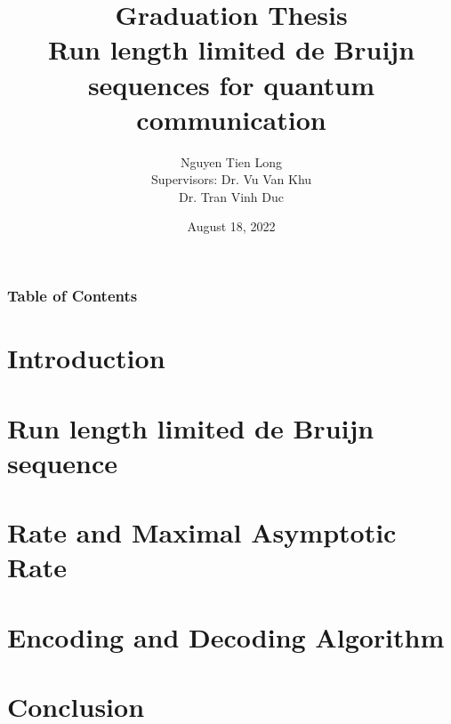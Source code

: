 \documentclass{beamer}
\title[]{{\huge \bf Graduation Thesis} \\
\large Run length limited de Bruijn sequences for quantum communication}
\author[Nguyen Tien Long]{
Nguyen Tien Long
\texorpdfstring{ \\ {\small Supervisors: Dr. Vu Van Khu}  \\ {\small \hspace{21mm} Dr. Tran Vinh Duc}}{}
}
\institute[]{
School of Information and Communication Technology.
}
\date{August 18, 2022}
\begin{document}
\begin{frame}
    \titlepage
\end{frame}

\begin{frame}
    \frametitle{Table of Contents}
    \tableofcontents
\end{frame}

% 

\section{Introduction}


\section{Run length limited de Bruijn sequence}


\section{Rate and Maximal Asymptotic Rate}

\section{Encoding and Decoding Algorithm}


\section{Conclusion}

\end{document}
